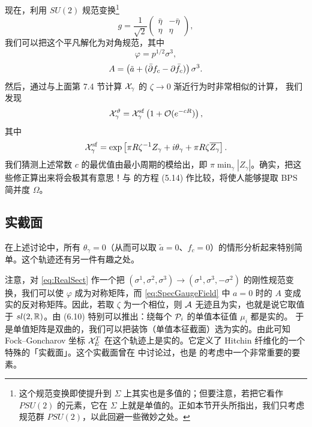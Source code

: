 现在，利用 $SU(2)$ 规范变换\footnote{这个规范变换即使提升到 $\Sigma$ 上其实也是多值的；但要注意，若把它看作 $PSU(2)$ 的元素，它在 $\Sigma$ 上就是单值的。正如本节开头所指出，我们只考虑规范群 $PSU(2)$，以此回避一些微妙之处。}
\begin{equation}\label{eq:unitarygtii}
g = \frac{1}{\sqrt{2}}\begin{pmatrix} \bar\eta & -\bar\eta \\ \eta & \eta \end{pmatrix},
\end{equation}
我们可以把这个平凡解化为对角规范，其中
\begin{equation}
\varphi = p^{1/2}\sigma^3,
\end{equation}
\begin{equation}
A = \left(\tilde a + (\bar\partial f_c - \partial\bar f_c)\right)\sigma^3.
\end{equation}
然后，通过与上面第 7.4 节计算 $\mathcal{X}_\gamma$ 的 $\zeta\to0$ 渐近行为时非常相似的计算，%
我们发现
\begin{equation}
\mathcal{X}^{\vartheta}_{\gamma} = \mathcal{X}_{\gamma}^{{\mathrm{sf}}}\left(1 + \mathcal{O}(e^{-cR})\right),
\end{equation}
其中
\begin{equation}
\mathcal{X}_{\gamma}^{{\mathrm{sf}}} = \exp\left[\pi R\zeta^{-1}Z_\gamma + i\theta_\gamma + \pi R\zeta\overline{Z_\gamma}\right].
\end{equation}
我们猜测上述常数 $c$ 的最优值由最小周期的模给出，即 $\pi\min_\gamma|Z_\gamma|$。确实，把这些修正算出来将会极其有意思！与 \cite{Gaiotto:2008cd} 的方程 (5.14) 作比较，将使人能够提取 BPS 简并度 $\Omega$。

\subsection{实截面}

在上述讨论中，所有 $\theta_\gamma=0$（从而可以取 $\tilde a=0$、$f_c=0$）的情形分析起来特别简单。这个轨迹还有另一件有趣之处。

注意，对 \eqref{eq:RealSect} 作一个把 $(\sigma^1,\sigma^2,\sigma^3)\to(\sigma^1,\sigma^3,-\sigma^2)$ 的刚性规范变换，我们可以使 $\varphi$ 成为对称矩阵，而 \eqref{eq:SpecGaugeField} 中 $a=0$ 时的 $A$ 变成实的反对称矩阵。因此，若取 $\zeta$ 为一个相位，则 $\mathcal{A}$ 无迹且为实，也就是说它取值于 $sl(2,\mathbb{R})$。由 (6.10) 特别可以推出：绕每个 $\mathcal{P}_i$ 的单值本征值 $\mu_i$ 都是实的。%
于是单值矩阵是双曲的，我们可以把装饰（单值本征截面）选为实的。由此可知 Fock–Goncharov 坐标 $\mathcal{X}^T_E$ 在这个轨迹上是实的。它定义了 Hitchin 纤维化的一个特殊的「实截面」。这个实截面曾在 \cite{MR89a:32021,MR1174252} 中讨论过，也是 \cite{MR2233852} 的考虑中一个非常重要的要素。

